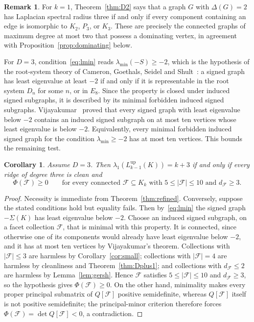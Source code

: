 \documentclass[11pt,reqno]{amsart}
\numberwithin{equation}{section}
\theoremstyle{plain}
\newtheorem{corollary}[theorem]{Corollary}
\theoremstyle{definition}
\newtheorem{remark}[theorem]{Remark}
\newcommand{\Lup}{L^{\mathrm{up}}}
\newcommand{\Fset}{\mathcal F}
\begin{document}
\begin{remark}
For $k=1$,
Theorem~\ref{thm:D2} says that a graph $G$ with $\Delta(G)=2$ has Laplacian spectral radius three
if and only if every component containing an edge is isomorphic to $K_2$, $P_3$, or $K_3$.
These are precisely the connected graphs of maximum degree at most two that possess a dominating
vertex, in agreement with Proposition~\ref{prop:dominating} below.
\end{remark}

For $D=3$, condition~\eqref{eq:lmin} reads $\lambda_{\min}(-S)\ge-2$, which is the hypothesis of
the root-system theory of Cameron, Goethals, Seidel and Shult~\cite{CGSS}: a signed graph has
least eigenvalue at least $-2$ if and only if it is representable in the root system $D_n$ for
some $n$, or in $E_8$. Since the property is closed under induced signed subgraphs, it is
described by its minimal forbidden induced signed subgraphs. Vijayakumar~\cite{Vijayakumar}
proved that every signed graph with least eigenvalue below $-2$ contains an induced signed
subgraph on at most ten vertices whose least eigenvalue is below $-2$. Equivalently, every
minimal forbidden induced signed graph for the condition $\lambda_{\min}\ge-2$ has at most ten
vertices. This bounds the remaining test.

\begin{corollary}\label{cor:D3}
Assume $D=3$. Then $\lambda_1(\Lup_{k-1}(K))=k+3$ if and only if every ridge of degree three
is clean and
\[
  \Phi(\Fset)\ge0\qquad\text{for every connected }\Fset\subseteq K_k
  \text{ with } 5\le|\Fset|\le10 \text{ and } d_{\Fset}\ge3 .
\]
\end{corollary}

\begin{proof}
Necessity is immediate from Theorem~\ref{thm:refined}. Conversely, suppose the stated conditions
hold but equality fails. Then by~\eqref{eq:lmin} the signed graph $-\Sigma(K)$ has least
eigenvalue below $-2$. Choose an induced signed subgraph, on a facet collection $\Fset$, that is
minimal with this property. It is connected, since otherwise one of its components would already
have least eigenvalue below $-2$, and it has at most ten vertices by Vijayakumar's theorem.
Collections with $|\Fset|\le3$ are harmless by Corollary~\ref{cor:small}; collections with
$|\Fset|=4$ are harmless by cleanliness and Theorem~\ref{thm:Dplus1}; and collections with
$d_{\Fset}\le2$ are harmless by Lemma~\ref{lem:gersh}. Hence $\Fset$ satisfies
$5\le|\Fset|\le10$ and $d_{\Fset}\ge3$, so the hypothesis gives $\Phi(\Fset)\ge0$. On the other
hand, minimality makes every proper principal submatrix of $Q[\Fset]$ positive semidefinite,
whereas $Q[\Fset]$ itself is not positive semidefinite; the principal-minor criterion therefore
forces $\Phi(\Fset)=\det Q[\Fset]<0$, a contradiction.
\end{proof}
\end{document}
